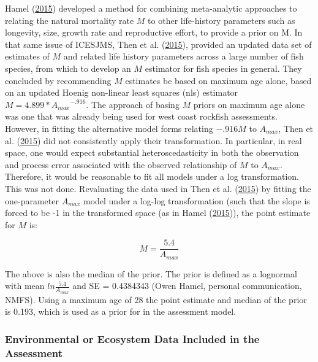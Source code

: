 \documentclass[12pt,]{article}
\begin{document}
Hamel (\protect\hyperlink{ref-Hamel2015}{2015}) developed a method for
combining meta-analytic approaches to relating the natural mortality
rate \(M\) to other life-history parameters such as longevity, size,
growth rate and reproductive effort, to provide a prior on M. In that
same issue of ICESJMS, Then et al.
(\protect\hyperlink{ref-Then2015}{2015}), provided an updated data set
of estimates of \(M\) and related life history parameters across a large
number of fish species, from which to develop an \(M\) estimator for
fish species in general. They concluded by recommending \(M\) estimates
be based on maximum age alone, based on an updated Hoenig non-linear
least squares (nls) estimator \(M= 4.899*{A_{max}}^{-.916}\). The
approach of basing \(M\) priors on maximum age alone was one that was
already being used for west coast rockfish assessments. However, in
fitting the alternative model forms relating \(-.916M\) to \(A_{max}\),
Then et al. (\protect\hyperlink{ref-Then2015}{2015}) did not
consistently apply their transformation. In particular, in real space,
one would expect substantial heteroscedasticity in both the observation
and process error associated with the observed relationship of \(M\) to
\(A_{max}\). Therefore, it would be reasonable to fit all models under a
log transformation. This was not done. Revaluating the data used in Then
et al. (\protect\hyperlink{ref-Then2015}{2015}) by fitting the
one-parameter \(A_{max}\) model under a log-log transformation (such
that the slope is forced to be -1 in the transformed space (as in Hamel
(\protect\hyperlink{ref-Hamel2015}{2015})), the point estimate for \(M\)
is:

\begin{equation}
M = \frac{5.4}{A_{max}}
\end{equation}

The above is also the median of the prior. The prior is defined as a
lognormal with mean \(ln\frac{5.4}{A_{max}}\) and SE = 0.4384343 (Owen
Hamel, personal communication, NMFS). Using a maximum age of 28 the
point estimate and median of the prior is 0.193, which is used as a
prior for in the assessment model.

\vspace{.5cm}

\subsubsection{Environmental or Ecosystem Data Included in the
Assessment}\label{environmental-or-ecosystem-data-included-in-the-assessment}
\end{document}
